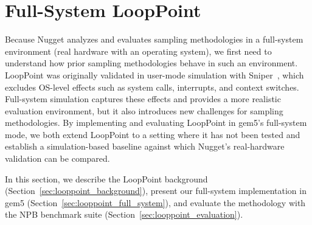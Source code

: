 \section{Full-System LoopPoint}\label{sec:full_system_looppoint}

Because Nugget analyzes and evaluates sampling methodologies in a full-system environment (real hardware with an operating system), we first need to understand how prior sampling methodologies behave in such an environment.
LoopPoint was originally validated in user-mode simulation with Sniper~\cite{sniper}, which excludes OS-level effects such as system calls, interrupts, and context switches.
Full-system simulation captures these effects and provides a more realistic evaluation environment, but it also introduces new challenges for sampling methodologies.
By implementing and evaluating LoopPoint in gem5's full-system mode, we both extend LoopPoint to a setting where it has not been tested and establish a simulation-based baseline against which Nugget's real-hardware validation can be compared.

In this section, we describe the LoopPoint background (Section~\ref{sec:looppoint_background}), present our full-system implementation in gem5 (Section~\ref{sec:looppoint_full_system}), and evaluate the methodology with the NPB benchmark suite (Section~\ref{sec:looppoint_evaluation}).

